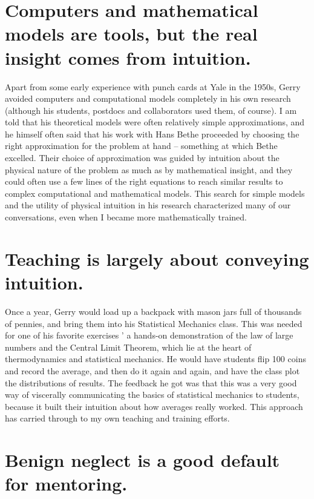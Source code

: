 \section{Computers and mathematical models are tools, but the real insight
comes from intuition.}

Apart from some early experience with punch cards at Yale in the
1950s, Gerry avoided computers and computational models completely in
his own research (although his students, postdocs and collaborators
used them, of course). I am told that his theoretical models were
often relatively simple approximations, and he himself often said that
his work with Hans Bethe proceeded by choosing the right approximation
for the problem at hand -- something at which Bethe excelled. Their
choice of approximation was guided by intuition about the physical
nature of the problem as much as by mathematical insight, and they
could often use a few lines of the right equations to reach similar
results to complex computational and mathematical models. This search
for simple models and the utility of physical intuition in his
research characterized many of our conversations, even when I became
more mathematically trained.

\section{Teaching is largely about conveying intuition.}

Once a year, Gerry would load up a backpack with mason jars full of
thousands of pennies, and bring them into his Statistical Mechanics
class. This was needed for one of his favorite exercises ' a hands-on
demonstration of the law of large numbers and the Central Limit
Theorem, which lie at the heart of thermodynamics and statistical
mechanics. He would have students flip 100 coins and record the
average, and then do it again and again, and have the class plot the
distributions of results. The feedback he got was that this was a very
good way of viscerally communicating the basics of statistical
mechanics to students, because it built their intuition about how
averages really worked. This approach has carried through to my own
teaching and training efforts.

\section{Benign neglect is a good default for mentoring.}

